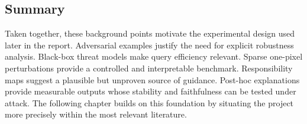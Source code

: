 \subsection{Summary}
Taken together, these background points motivate the experimental design used later in the report.
Adversarial examples justify the need for explicit robustness analysis.
Black-box threat models make query efficiency relevant.
Sparse one-pixel perturbations provide a controlled and interpretable benchmark.
Responsibility maps suggest a plausible but unproven source of guidance.
Post-hoc explanations provide measurable outputs whose stability and faithfulness can be tested under attack.
The following chapter builds on this foundation by situating the project more precisely within the most relevant literature.
